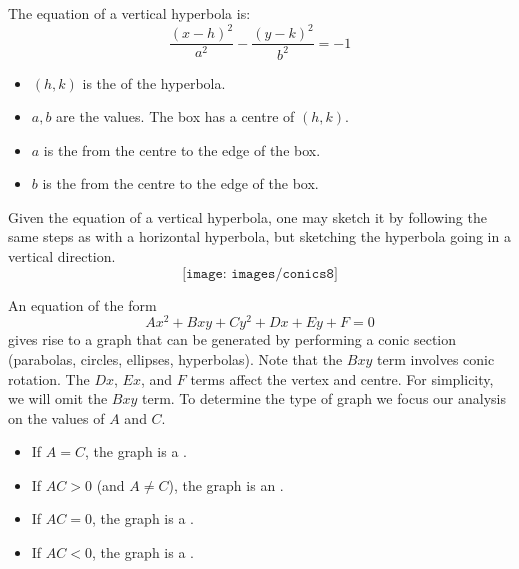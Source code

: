 \bigskip\noindent
{} The equation of a vertical hyperbola is:
$$\frac{(x-h)^2}{a^2}-\frac{(y-k)^2}{b^2}=-1$$
\begin{multicols}{2}
\begin{itemize}
	\item $(h,k)$ is the  of the hyperbola.
	\item $a,b$ are the  values. The box has a centre of $(h,k)$.
	\item $a$ is the  from the centre to the edge of the box.
	\item $b$ is the  from the centre to the edge of the box.
\end{itemize}
\end{multicols}
Given the equation of a vertical hyperbola, one may sketch it by following the same steps as with a horizontal hyperbola, but sketching the hyperbola going in a vertical direction.
$$\texttt{[image: images/conics8]}$$

\begin{formulabox}
An equation of the form
$$Ax^2+Bxy+Cy^2+Dx+Ey+F=0$$
gives rise to a graph that can be generated by performing a conic section (parabolas, circles, ellipses, hyperbolas).
Note that the $Bxy$ term involves conic rotation. The $Dx$, $Ex$, and $F$ terms affect the vertex and centre.
For simplicity, we will omit the $Bxy$ term.
To determine the type of graph we focus our analysis on the values of $A$ and $C$.
\begin{itemize}\setlength{\itemsep}{0 in}
	\item If $A=C$, the graph is a .
	\item If $AC>0$ (and $A\neq C$), the graph is an .
	\item If $AC=0$, the graph is a .
	\item If $AC<0$, the graph is a .
\end{itemize}
\end{formulabox}

